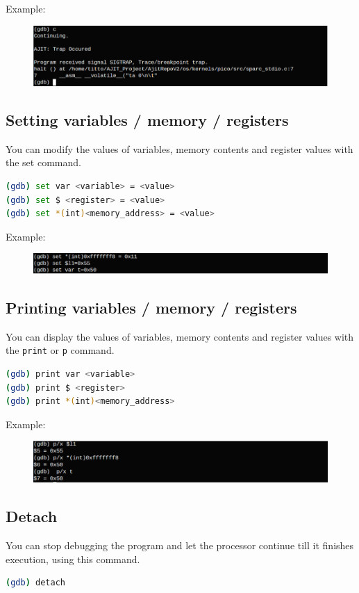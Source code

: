 \documentclass[a4paper, 11pt]{article}
\begin{document}
Example:
\begin{figure}[H]
	\centering
	\includegraphics[width=0.8\columnwidth]{Figs/eigth.png}
\end{figure}
\subsection*{Setting variables / memory / registers}
You can modify the values of variables, memory contents and register values with the set command.
\begin{lstlisting}[language=bash]
(gdb) set var <variable> = <value>
(gdb) set $ <register> = <value>
(gdb) set *(int)<memory_address> = <value>
\end{lstlisting}
Example:
\begin{figure}[H]
	\centering
	\includegraphics[width=0.8\columnwidth]{Figs/nine.png}
\end{figure}
\subsection*{Printing variables / memory / registers}
You can display the values of variables, memory contents and register values with the \texttt{print} or \texttt{p} command.
\begin{lstlisting}[language=bash]
(gdb) print var <variable>
(gdb) print $ <register>
(gdb) print *(int)<memory_address>
\end{lstlisting}
Example:
\begin{figure}[H]
	\centering
	\includegraphics[width=0.8\columnwidth]{Figs/eleven.png}
\end{figure}
\subsection*{Detach}
You can stop debugging the program and let the processor continue till it finishes execution, using this command.
\begin{lstlisting}[language=bash]
(gdb) detach
\end{lstlisting}
\end{document}
